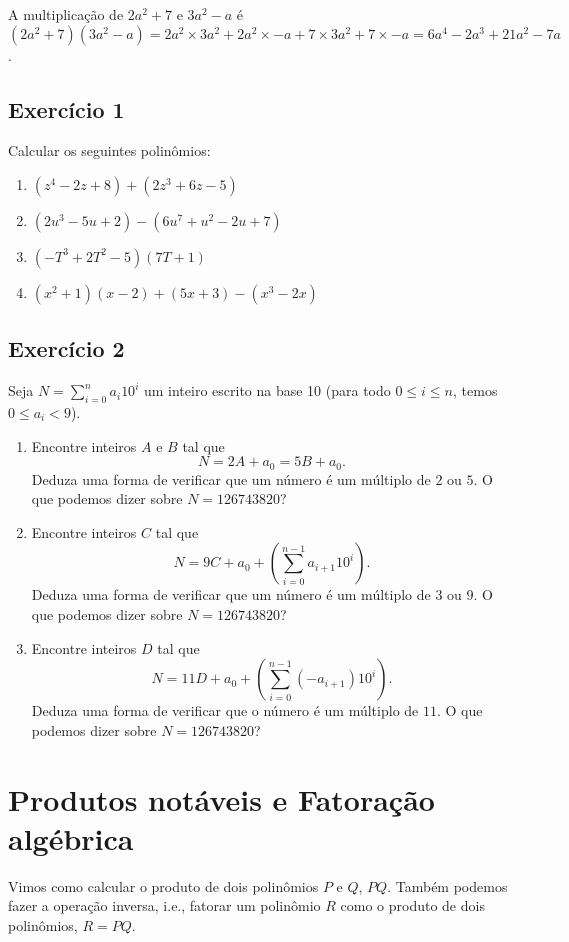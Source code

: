 A multiplicação de $2a^2 + 7$ e $3a^2 - a$ é
$(2a^2 + 7)(3a^2 - a) = 2a^2 \times 3a^2 + 2a^2 \times -a + 7 \times 3a^2 +
7 \times -a = 6a^4 - 2a^3 + 21a^2 - 7a$.

\subsection*{Exercício 1}

Calcular os seguintes polinômios:
\begin{enumerate}
\item $(z^4 - 2z + 8) + (2z^3 + 6z - 5)$
\item $(2u^3 - 5u + 2) - (6u^7 + u^2 - 2u + 7)$
\item ${(-T^3 + 2T^2 - 5)}{(7T + 1)}$
\item $(x^2 + 1)(x - 2) + (5x+3) - (x^3 - 2x)$
\end{enumerate}

\subsection*{Exercício 2}

Seja $N = \sum_{i=0}^n a_i 10^i$ um inteiro escrito na base 10 (para todo $0
\leq i \leq n$, temos $0 \leq a_i < 9$).

\begin{enumerate}
\item Encontre inteiros $A$ e $B$ tal que
  $$N = 2A  + a_0 = 5B + a_0.$$
  Deduza uma forma de verificar que um número é um múltiplo de $2$ ou $5$.
  O que podemos dizer sobre $N=126743820$?

\item Encontre inteiros $C$ tal que
  $$N = 9C + a_0 + \left(\sum_{i=0}^{n-1} a_{i+1} 10^i\right).$$
  Deduza uma forma de verificar que um número é um múltiplo de $3$ ou $9$.
  O que podemos dizer sobre $N=126743820$?

\item Encontre inteiros $D$ tal que
  $$N = 11D + a_0 + \left(\sum_{i=0}^{n-1} \left(-a_{i+1}\right) 10^i\right).$$
  Deduza uma forma de verificar que o número é um múltiplo de $11$.
  O que podemos dizer sobre $N=126743820$?
\end{enumerate}

\section{Produtos notáveis e Fatoração algébrica}

Vimos como calcular o produto de dois polinômios $P$ e $Q$, $PQ$. Também podemos
fazer a operação inversa, i.e., fatorar um polinômio $R$ como o produto de dois
polinômios, $R = PQ$.

